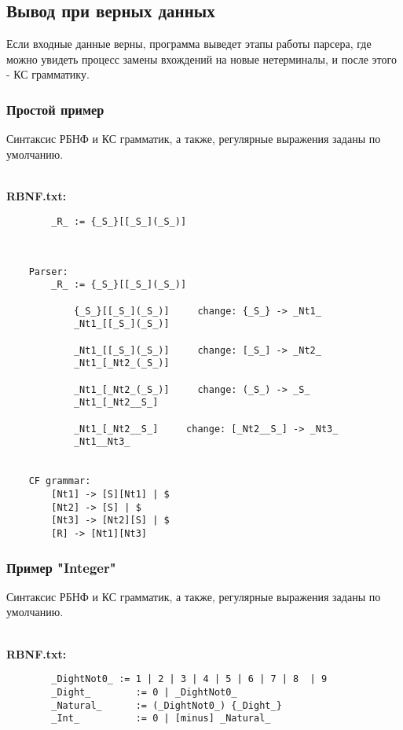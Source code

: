 \documentclass[12pt]{article}
\begin{document}
    \subsection{Вывод при верных данных}

    Если входные данные верны, программа выведет этапы работы парсера, где можно увидеть процесс замены вхождений на новые нетерминалы, и после этого - КС грамматику.

    \clearpage


    \subsubsection*{\large Простой пример}
    Синтаксис РБНФ и КС грамматик, а также, регулярные выражения заданы по умолчанию.

    \hfill \\
    {\bfseries RBNF.txt:}
    \begin{lstlisting}
        _R_ := {_S_}[[_S_](_S_)]
    \end{lstlisting}

    \hfill \\  %
    \begin{lstlisting}
    Parser:
        _R_ := {_S_}[[_S_](_S_)]

            {_S_}[[_S_](_S_)]     change: {_S_} -> _Nt1_
            _Nt1_[[_S_](_S_)]

            _Nt1_[[_S_](_S_)]     change: [_S_] -> _Nt2_
            _Nt1_[_Nt2_(_S_)]

            _Nt1_[_Nt2_(_S_)]     change: (_S_) -> _S_
            _Nt1_[_Nt2__S_]

            _Nt1_[_Nt2__S_]     change: [_Nt2__S_] -> _Nt3_
            _Nt1__Nt3_


    CF grammar:
        [Nt1] -> [S][Nt1] | $
        [Nt2] -> [S] | $
        [Nt3] -> [Nt2][S] | $
        [R] -> [Nt1][Nt3]
    \end{lstlisting}

    \clearpage


    \subsubsection*{\large Пример "Integer"}
    Синтаксис РБНФ и КС грамматик, а также, регулярные выражения заданы по умолчанию.

    \hfill \\
    {\bfseries RBNF.txt:}
    \begin{lstlisting}
        _DightNot0_ := 1 | 2 | 3 | 4 | 5 | 6 | 7 | 8  | 9
        _Dight_        := 0 | _DightNot0_
        _Natural_      := (_DightNot0_) {_Dight_}
        _Int_          := 0 | [minus] _Natural_
    \end{lstlisting}
\end{document}
